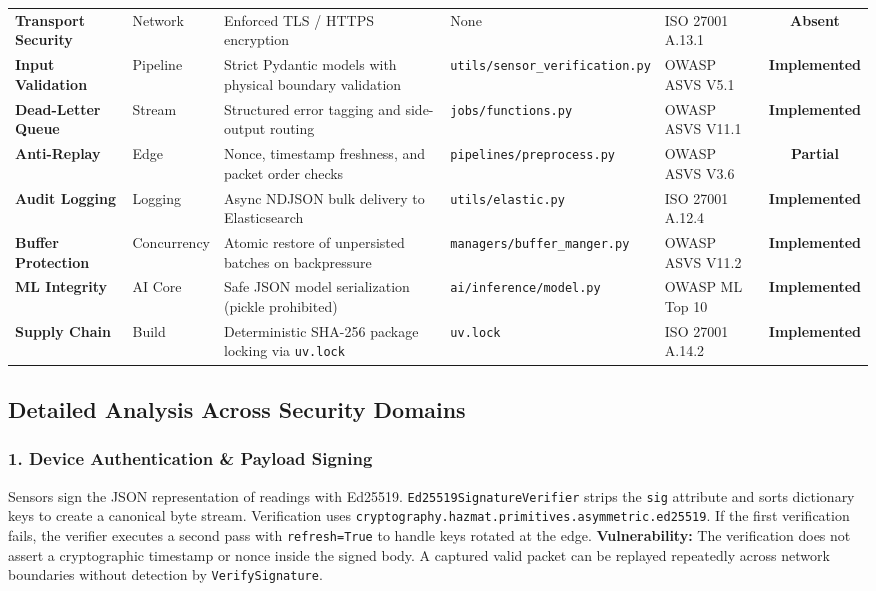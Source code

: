 \documentclass[10pt,a4paper]{report}
\begin{document}
\begin{center}
\begin{longtable}{llp{4.2cm}llc}
\textbf{Transport Security} & Network & Enforced TLS / HTTPS encryption & None & ISO 27001 A.13.1 & \textbf{Absent} \\
\textbf{Input Validation} & Pipeline & Strict Pydantic models with physical boundary validation & \texttt{utils/sensor\_verification.py} & OWASP ASVS V5.1 & \textbf{Implemented} \\
\textbf{Dead-Letter Queue} & Stream & Structured error tagging and side-output routing & \texttt{jobs/functions.py} & OWASP ASVS V11.1 & \textbf{Implemented} \\
\textbf{Anti-Replay} & Edge & Nonce, timestamp freshness, and packet order checks & \texttt{pipelines/preprocess.py} & OWASP ASVS V3.6 & \textbf{Partial} \\
\textbf{Audit Logging} & Logging & Async NDJSON bulk delivery to Elasticsearch & \texttt{utils/elastic.py} & ISO 27001 A.12.4 & \textbf{Implemented} \\
\textbf{Buffer Protection} & Concurrency & Atomic restore of unpersisted batches on backpressure & \texttt{managers/buffer\_manger.py} & OWASP ASVS V11.2 & \textbf{Implemented} \\
\textbf{ML Integrity} & AI Core & Safe JSON model serialization (pickle prohibited) & \texttt{ai/inference/model.py} & OWASP ML Top 10 & \textbf{Implemented} \\
\textbf{Supply Chain} & Build & Deterministic SHA-256 package locking via \texttt{uv.lock} & \texttt{uv.lock} & ISO 27001 A.14.2 & \textbf{Implemented} \\
\end{longtable}
\end{center}

\subsection{Detailed Analysis Across Security Domains}

\subsubsection{1. Device Authentication \& Payload Signing}
Sensors sign the JSON representation of readings with Ed25519. \texttt{Ed25519SignatureVerifier} strips the \texttt{sig} attribute and sorts dictionary keys to create a canonical byte stream. Verification uses \texttt{cryptography.hazmat.primitives.asymmetric.ed25519}. If the first verification fails, the verifier executes a second pass with \texttt{refresh=True} to handle keys rotated at the edge.
\textbf{Vulnerability:} The verification does not assert a cryptographic timestamp or nonce inside the signed body. A captured valid packet can be replayed repeatedly across network boundaries without detection by \texttt{VerifySignature}.
\end{document}
